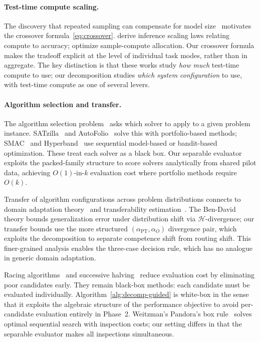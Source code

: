\documentclass[11pt]{article}
\begin{document}
\paragraph{Test-time compute scaling.}
The discovery that repeated sampling can compensate for model
size~\citep{brown2024monkeys,snell2025testtime} motivates the
crossover formula~\eqref{eq:crossover}.
\citet{wu2025inference} derive inference scaling laws relating compute
to accuracy; \citet{osca2024} optimize sample-compute allocation.
Our crossover formula makes the tradeoff explicit at the level of individual
task modes, rather than in aggregate.
The key distinction is that these works study \emph{how much}
test-time compute to use; our decomposition studies \emph{which system
configuration} to use, with test-time compute as one of several levers.

\paragraph{Algorithm selection and transfer.}
The algorithm selection problem~\citep{rice1976algorithm} asks which
solver to apply to a given problem instance.
SATzilla~\citep{xu2012satzilla} and AutoFolio~\citep{lindauer2015autofolio}
solve this with portfolio-based methods; SMAC~\citep{hutter2011smac} and
Hyperband~\citep{li2017hyperband} use sequential model-based or
bandit-based optimization.  These treat each solver as a black box.
Our separable evaluator exploits the packed-family structure to score
solvers analytically from shared pilot data, achieving $O(1)$-in-$k$
evaluation cost where portfolio methods require $O(k)$.

Transfer of algorithm configurations across problem
distributions connects to domain adaptation
theory~\citep{bendavid2010theory,mansour2009domain} and
transferability estimation~\citep{achille2019task2vec,you2021logme,
pandy2022transferability}.  The Ben-David theory bounds generalization
error under distribution shift via $\mathcal{H}$-divergence; our transfer bounds
use the more structured $(\alpha_{\mathrm{PT}}, \alpha_O)$ divergence
pair, which exploits the decomposition to separate competence shift from
routing shift.  This finer-grained analysis enables the three-case
decision rule, which has no analogue in generic domain adaptation.

Racing algorithms~\citep{maron1993hoeffding,maron1997racing} and
successive halving~\citep{jamieson2016successive} reduce evaluation cost
by eliminating poor candidates early.  They remain black-box methods:
each candidate must be evaluated individually.
Algorithm~\ref{alg:decomp-guided} is white-box in the sense that it
exploits the algebraic structure of the performance objective to avoid
per-candidate evaluation entirely in Phase~2.
Weitzman's Pandora's box rule~\citep{weitzman1979optimal} solves optimal
sequential search with inspection costs; our setting differs in that the
separable evaluator makes all inspections simultaneous.
\end{document}
